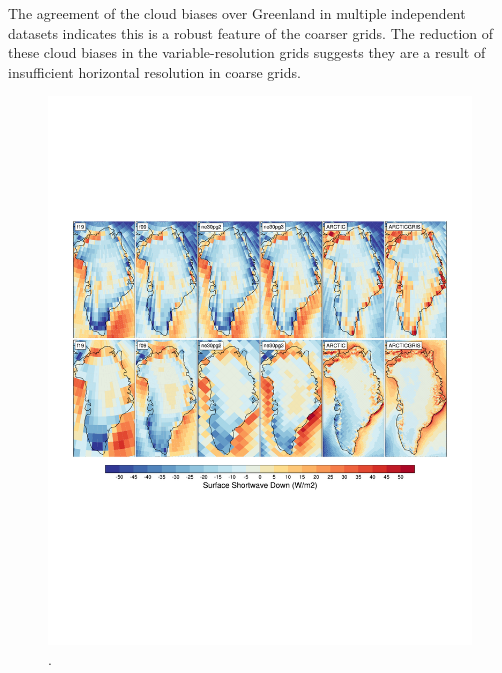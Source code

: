 \documentclass[draft]{agujournal2019}
\begin{document}
The agreement of the cloud biases over Greenland in multiple independent datasets indicates this is a robust feature of the coarser grids. The reduction of these cloud biases in the variable-resolution grids suggests they are a result of insufficient horizontal resolution in coarse grids.

\begin{figure}[t]
\begin{center}
         \includegraphics[width=130mm]{figs/temp_contours_diffCERESdiffRACMO_FSDS.pdf}
\end{center}
\caption{.}
\label{fig:FSDS}
\end{figure}
\end{document}
